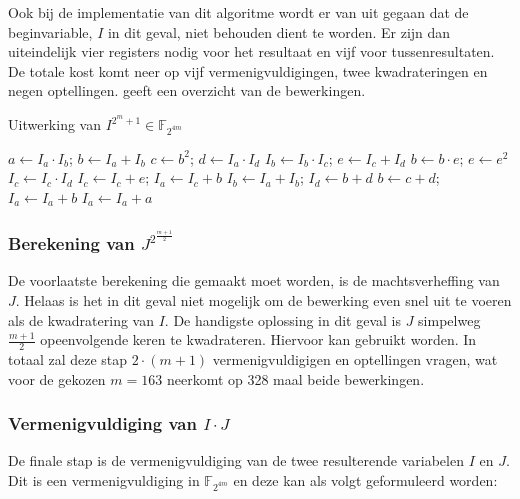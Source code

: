 Ook bij de implementatie van dit algoritme wordt er van uit gegaan dat de beginvariable, $I$ in dit geval, niet behouden dient te worden. Er zijn dan uiteindelijk vier registers nodig voor het resultaat en vijf voor tussenresultaten. De totale kost komt neer op vijf vermenigvuldigingen, twee kwadrateringen en negen optellingen.  geeft een overzicht van de bewerkingen.

\begin{algorithm}[h]
	\caption{Uitwerking van $I^{2^m + 1} \in \mathbb{F}_{2^{4m}}$}
	\label{algoritme-implementatie-miller-v-power}
	$a \gets I_a \cdot I_b$; $b \gets I_a + I_b$\;
	$c \gets b^2$; $d \gets I_a \cdot I_d$\;
	$I_b \gets I_b \cdot I_c$; $e \gets I_c + I_d$\;
	$b \gets b \cdot e$; $e \gets e^2$\;
	$I_c \gets I_c \cdot I_d$\; 
	$I_c \gets I_c + e$; $I_a \gets I_c + b$\;
	$I_b \gets I_a + I_b$; $I_d \gets b + d$\;
	$b \gets c + d$; $I_a \gets I_a + b$\;
	$I_a \gets I_a + a$\;
\end{algorithm}

\subsubsection{Berekening van $J^{2^{\frac{m + 1}{2}}}$}

De voorlaatste berekening die gemaakt moet worden, is de machtsverheffing van $J$. Helaas is het in dit geval niet mogelijk om de bewerking even snel uit te voeren als de kwadratering van $I$. De handigste oplossing in dit geval is $J$ simpelweg $\frac{m + 1}{2}$ opeenvolgende keren te kwadrateren. Hiervoor kan  gebruikt worden. In totaal zal deze stap $2 \cdot (m + 1)$ vermenigvuldigigen en optellingen vragen, wat voor de gekozen $m = 163$ neerkomt op 328 maal beide bewerkingen.

\subsubsection{Vermenigvuldiging van $I \cdot J$}

De finale stap is de vermenigvuldiging van de twee resulterende variabelen $I$ en $J$. Dit is een vermenigvuldiging in $\mathbb{F}_{2^{4m}}$ en deze kan als volgt geformuleerd worden:

